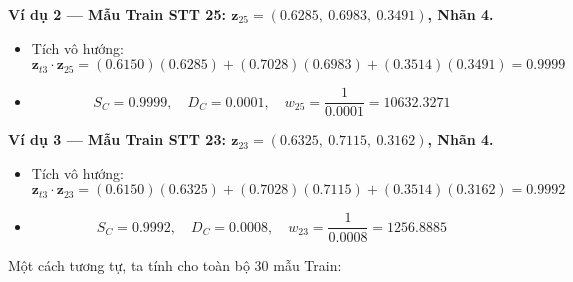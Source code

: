 \documentclass[12pt,a4paper]{article}
\begin{document}
\textbf{Ví dụ 2 — Mẫu Train STT 25: $\mathbf{z}_{25} = (0.6285,\ 0.6983,\ 0.3491)$, Nhãn 4.}
\begin{itemize}
    \item Tích vô hướng:
    \[
        \mathbf{z}_{t3} \cdot \mathbf{z}_{25}
        = (0.6150)(0.6285) + (0.7028)(0.6983) + (0.3514)(0.3491) = 0.9999
    \]
    \item
    \[
        S_C = 0.9999, \quad D_C = 0.0001, \quad
        w_{25} = \frac{1}{0.0001} = 10632.3271
    \]
\end{itemize}
 
\textbf{Ví dụ 3 — Mẫu Train STT 23: $\mathbf{z}_{23} = (0.6325,\ 0.7115,\ 0.3162)$, Nhãn 4.}
\begin{itemize}
    \item Tích vô hướng:
    \[
        \mathbf{z}_{t3} \cdot \mathbf{z}_{23}
        = (0.6150)(0.6325) + (0.7028)(0.7115) + (0.3514)(0.3162) = 0.9992
    \]
    \item
    \[
        S_C = 0.9992, \quad D_C = 0.0008, \quad
        w_{23} = \frac{1}{0.0008} = 1256.8885
    \]
\end{itemize}
 
Một cách tương tự, ta tính cho toàn bộ 30 mẫu Train:
 
\end{document}
